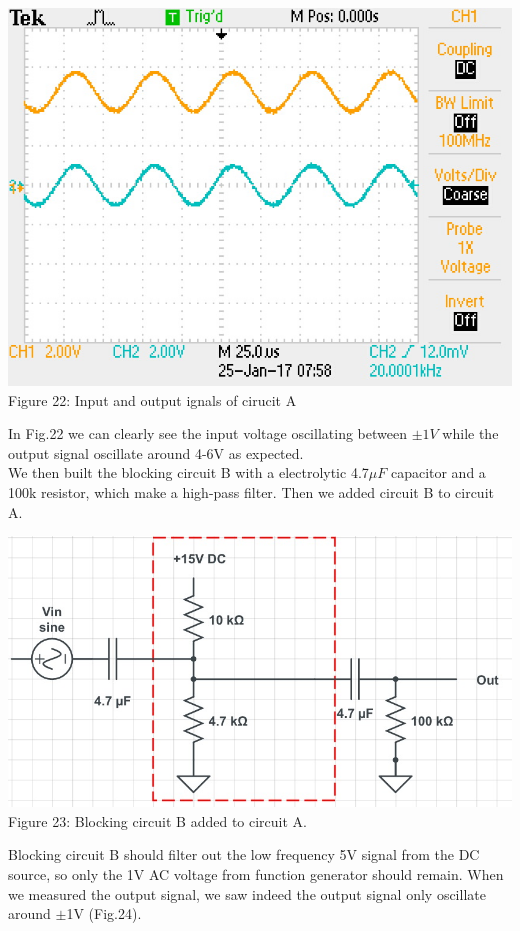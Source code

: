 \documentclass[]{article}
\begin{document}
		\begin{center}
			\includegraphics[scale=0.7]{i_top}\\
			Figure 22: Input and output ignals of cirucit A
		\end{center}
In Fig.22 we can clearly see the input voltage oscillating between $\pm 1V$ while the output signal oscillate around 4-6V as expected. \\
We then built the blocking circuit B with a electrolytic 4.7$\mu F$ capacitor and a 100k resistor, which make a high-pass filter. Then we added circuit B to circuit A. 
	\begin{center}
		\includegraphics[scale=0.26]{i_circuitAB}\\
		Figure 23: Blocking circuit B added to circuit A.
	\end{center}
Blocking circuit B should filter out the low frequency 5V signal from the DC source, so only the 1V AC voltage from function generator should remain. When we measured the output signal, we saw indeed the output signal only oscillate around $\pm$1V (Fig.24).
\end{document}

